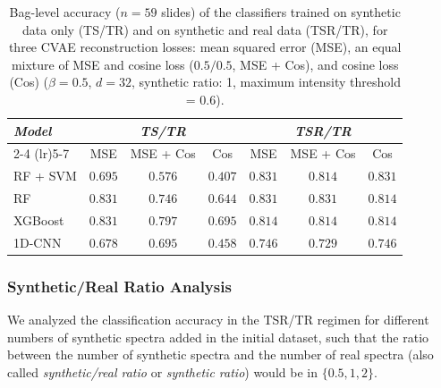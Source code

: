 \documentclass[12pt]{article}
\theoremstyle{paper}
\begin{document}
\begin{table}[H]
\centering
\small
\begin{tabular*}{\textwidth}{@{\extracolsep{\fill}}lcccccc}
\toprule
\multirow{2}{*}{\emph{Model}} & \multicolumn{3}{c}{\emph{TS/TR}} & \multicolumn{3}{c}{\emph{TSR/TR}} \\
\cmidrule(lr){2-4} \cmidrule(lr){5-7}
 & MSE & MSE + Cos & Cos & MSE & MSE + Cos & Cos \\
\midrule
RF + SVM & $0.695$ & $0.576$ & $0.407$ & $0.831$ & $0.814$ & $0.831$ \\
RF & $0.831$ & $0.746$ & $0.644$ & $0.831$ & $0.831$ & $0.814$ \\
XGBoost & $0.831$ & $0.797$ & $0.695$ & $0.814$ & $0.814$ & $0.814$ \\
1D-CNN & $0.678$ & $0.695$ & $0.458$ & $0.746$ & $0.729$ & $0.746$ \\
\bottomrule
\end{tabular*}
\caption{\small Bag-level accuracy ($n=59$ slides) of the classifiers trained on synthetic data only (TS/TR) and on synthetic and real data (TSR/TR), for three CVAE reconstruction losses: mean squared error (MSE), an equal mixture of MSE and cosine loss ($0.5/0.5$, MSE + Cos), and cosine loss (Cos) ($\beta=0.5$, $d=32$, synthetic ratio: 1, maximum intensity threshold = 0.6).}
\label{tab:recon_loss_results}
\end{table}

\subsubsection{Synthetic/Real Ratio Analysis}

We analyzed the classification accuracy in the TSR/TR regimen for different numbers of synthetic spectra added in the initial dataset, such that the ratio between the number of synthetic spectra and the number of real spectra (also called \textit{synthetic/real ratio} or \textit{synthetic ratio}) would be in $\{0.5, 1, 2\}$. 
\end{document}
